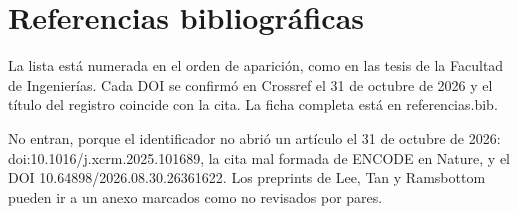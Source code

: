 \documentclass[12pt,oneside]{report}
\begin{document}
\chapter{Referencias bibliográficas}
La lista está numerada en el orden de aparición, como en las tesis de la Facultad de Ingenierías. Cada DOI se confirmó en Crossref el 31 de octubre de 2026 y el título del registro coincide con la cita. La ficha completa está en referencias.bib.

No entran, porque el identificador no abrió un artículo el 31 de octubre de 2026: doi:10.1016/j.xcrm.2025.101689, la cita mal formada de ENCODE en Nature, y el DOI 10.64898/2026.08.30.26361622. Los preprints de Lee, Tan y Ramsbottom pueden ir a un anexo marcados como no revisados por pares.

\printbibliography[heading=none]
\end{document}
